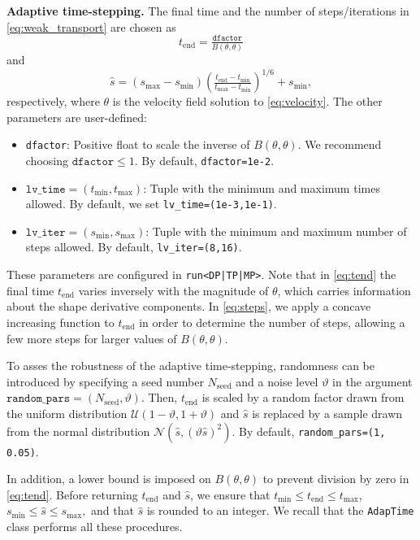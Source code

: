 \documentclass[preprint,9pt]{elsarticle}
\begin{document}
\vspace*{0.5cm}
\noindent\textbf{Adaptive time-stepping.} 
The final time and the number of steps/iterations in \eqref{eq:weak_transport}
are chosen as
\begin{equation}\label{eq:tend}
	t_{\text{end}} = \tfrac{\texttt{dfactor}}{B(\theta, \theta)}
\end{equation}
and 
\begin{equation}\label{eq:steps}
	\hat{s} =
	(s_{\max}-s_{\min})
	\left( \tfrac{t_{\text{end}}-t_{\min}}{t_{\max} - t_{\min}}\right)^{1/6}
	+ s_{\min},
\end{equation}
respectively, where
$\theta$ is the velocity field solution to \eqref{eq:velocity}.
The other parameters are user-defined:
\begin{itemize}
	\item \texttt{dfactor}:
	Positive float to scale the inverse of $B(\theta, \theta)$.
	We recommend choosing $\texttt{dfactor}\leq1$.
	By default, \texttt{dfactor=1e-2}.
	\item $\texttt{lv\_time} = (t_{\min}, t_{\max})$:
	Tuple with the minimum and maximum times allowed.
	By default, we set \texttt{lv\_time=(1e-3,1e-1)}.
	\item $\texttt{lv\_iter} = (s_{\min}, s_{\max})$:
	Tuple with the minimum and maximum number of steps allowed.
	By default, \texttt{lv\_iter=(8,16)}.
\end{itemize}
These parameters are configured in \texttt{run<DP|TP|MP>}.
Note that in \eqref{eq:tend} the final time $t_{\text{end}}$
varies inversely with the magnitude of $\theta$,
which carries information about the shape derivative components.
In \eqref{eq:steps}, we apply a concave increasing function
to $t_{\text{end}}$ in order to determine the number of steps,
allowing a few more steps for larger values of $B(\theta, \theta)$.

To asses the robustness of the adaptive time-stepping,
randomness can be introduced by specifying
a seed number $N_\mathrm{seed}$ and a noise level $\vartheta$ in the argument
$\texttt{random\_pars} = (N_\mathrm{seed}, \vartheta)$. Then,
$t_{\text{end}}$ is scaled by a random factor drawn from
the uniform distribution $\mathcal{U}(1 - \vartheta, 1 + \vartheta)$
and $\hat{s}$ is replaced by a sample drawn from the normal distribution
$\mathcal{N}(\hat{s}, (\vartheta \hat{s})^2)$.
By default, \texttt{random\_pars=(1, 0.05)}.

In addition, a lower bound is imposed on $B(\theta, \theta)$
to prevent division by zero in \eqref{eq:tend}.
Before returning $t_{\text{end}}$ and $\hat{s}$, we ensure that
$
	t_{\min}\leq t_{\text{end}} \leq t_{\max}$, 
$	s_{\min}\leq \hat{s} \leq s_{\max},
$
and that $\hat{s}$ is rounded to an integer.
We recall that the \texttt{AdapTime} class 
performs all these procedures.
\end{document}
